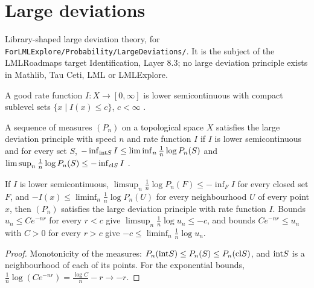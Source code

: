 \chapter{Large deviations}
\label{chap:prereq_ldp}

Library-shaped large deviation theory, for \texttt{ForLMLExplore/Probability/LargeDeviations/}.
It is the subject of the LMLRoadmaps target Identification, Layer 8.3; no large deviation
principle exists in Mathlib, Tau Ceti, LML or LMLExplore.

\begin{definition}
  \label{def:good_rate}
  \leanok
  A good rate function $I : X \to [0, \infty]$ is lower semicontinuous with compact sublevel sets
  $\{x \mid I(x) \le c\}$, $c < \infty$ \cite{DZ98}.
\end{definition}

\begin{definition}
  \label{def:ldp}
  \leanok
  A sequence of measures $(P_n)$ on a topological space $X$ satisfies the large deviation
  principle with speed $n$ and rate function $I$ if $I$ is lower semicontinuous and for every set
  $S$,
  $-\inf_{\mathrm{int} S} I \le \liminf_n \frac1n \log P_n(S)$ and
  $\limsup_n \frac1n \log P_n(S) \le -\inf_{\mathrm{cl} S} I$ \cite{DZ98}.
\end{definition}

\begin{lemma}
  \label{lem:ldp_of_bounds}
  \leanok
  If $I$ is lower semicontinuous, $\limsup_n \frac1n \log P_n(F) \le -\inf_F I$ for every closed
  set $F$, and $-I(x) \le \liminf_n \frac1n \log P_n(U)$ for every neighbourhood $U$ of every point
  $x$, then $(P_n)$ satisfies the large deviation principle with rate function $I$. Bounds
  $u_n \le C e^{-n r}$ for every $r < c$ give $\limsup_n \frac1n \log u_n \le -c$, and bounds
  $C e^{-n r} \le u_n$ with $C > 0$ for every $r > c$ give $-c \le \liminf_n \frac1n \log u_n$.
\end{lemma}

\begin{proof}
  \leanok
  Monotonicity of the measures: $P_n(\mathrm{int} S) \le P_n(S) \le P_n(\mathrm{cl} S)$, and $\mathrm{int} S$ is a
  neighbourhood of each of its points. For the exponential bounds, $\frac1n \log(C e^{-n r}) =
  \frac{\log C}{n} - r \to -r$.
\end{proof}

